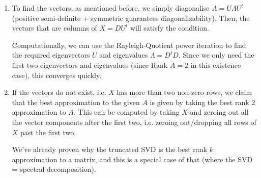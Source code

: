 \documentclass[12pt]{article}
\newenvironment*{qparts}{\begin{enumerate}[label=(\alph*)]}{\end{enumerate}}
\begin{document}
\begin{qparts}
	Then, the vectors lie in a plane if and only if $\text{Rank } X = \text{Rank } A \leq 2$.

	\item To find the vectors, as mentioned before, we simply diagonalise $A = U\Lambda U^t$ (positive semi-definite + symmetric guarantees diagonalizability). Then, the vectors that are columns of $X = DU^t$ will satisfy the condition.\medskip
	
	Computationally, we can use the Rayleigh-Quotient power iteration to find the required eigenvectors $U$ and eigenvalues $\Lambda = D^tD$. Since we only need the first two eigenvectors and eigenvalues (since Rank $A = 2$ in this existence case), this converges quickly.

	\item If the vectors do not exist, i.e. $X$ has more than two non-zero rows, we claim that the best approximation to the given $A$ is given by taking the best rank $2$ approximation to $A$. This can be computed by taking $X$ and zeroing out all the vector components after the first two, i.e. zeroing out/dropping all rows of $X$ past the first two.\medskip
	
	We've already proven why the truncated SVD is the best rank $k$ approximation to a matrix, and this is a special case of that (where the SVD = spectral decomposition).\medskip
\end{qparts}
\end{document}
